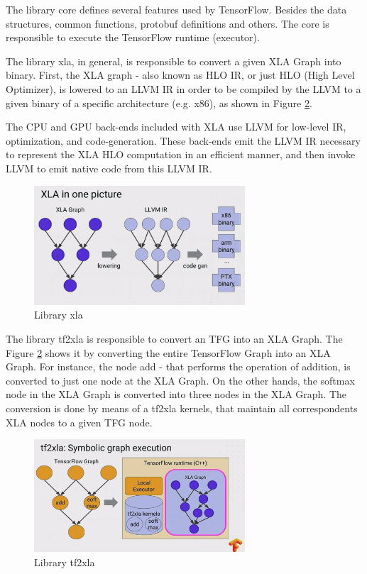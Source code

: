 \documentclass[11pt, fleqn]{article}
\begin{document}
The library core defines several features used by TensorFlow. Besides the data structures, common functions, protobuf definitions and others. The core is responsible to execute the TensorFlow runtime (executor).

The library xla, in general, is responsible to convert a given XLA Graph into binary. First, the XLA graph - also known as HLO IR, or just HLO (High Level Optimizer), is lowered to an LLVM IR in order to be compiled by the LLVM to a given binary of a specific architecture (e.g. x86), as shown in Figure \ref{fig:xla_xlalib}. 

The CPU and GPU back-ends included with XLA use LLVM for low-level IR, optimization, and code-generation. These back-ends emit the LLVM IR necessary to represent the XLA HLO computation in an efficient manner, and then invoke LLVM to emit native code from this LLVM IR.

\begin{figure}[h]
    \centering
    \includegraphics[width=0.7\textwidth]{img/xlalib.png}
    \caption{Library xla}
    \label{fig:xla_xlalib}
\end{figure}

The library tf2xla is responsible to convert an TFG into an XLA Graph. The Figure \ref{fig:xla_xlalib} shows it by converting the entire TensorFlow Graph into an XLA Graph. For instance, the node add - that performs the operation of addition, is converted to just one node at the XLA Graph. On the other hands, the softmax node in the XLA Graph is converted into three nodes in the XLA Graph. The conversion is done by means of a tf2xla kernels, that maintain all correspondents XLA nodes to a given TFG node. 

\begin{figure}[h]
    \centering
    \includegraphics[width=0.7\textwidth]{img/tf2xlalib.png}
    \caption{Library tf2xla}
    \label{fig:xla_xlalib}
\end{figure}
\end{document}
